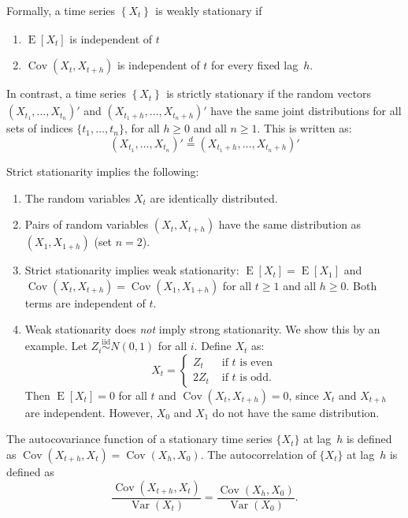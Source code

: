 \documentclass[11pt,a4]{article}
\DeclareMathOperator{\cov}{Cov}
\DeclareMathOperator{\E}{E}
\DeclareMathOperator{\var}{Var}
\newcommand{\ts}[3]{\ensuremath{\left \{ #1 \right \}_{#2}^{#3}}}
\newcommand{\eqd}{\ensuremath{\stackrel{d}{=}}}
\newcommand{\iid}{\ensuremath{\stackrel{\text{iid}}{\sim}}}
\begin{document}
Formally, a time series $\ts{X_t}{}{}$ is weakly stationary if 
\begin{enumerate}
	\item $\E[X_t]$ is independent of $t$
	\item $\cov(X_t, X_{t + h})$ is independent of $t$ for every fixed lag~$h$.
\end{enumerate} 
In contrast, a time series $\ts{X_t}{}{}$ is strictly stationary if the random vectors $(X_{t_1}, \ldots, X_{t_n})'$ and $(X_{t_1 + h}, \ldots, X_{t_n + h})'$
have the same joint distributions for all sets of indices 
$\{t_1, \ldots, t_n\}$, for all $h \geq 0$ and all $n \geq 1$. This is written 
as:
\[
(X_{t_1}, \ldots, X_{t_n})' \eqd (X_{t_1 + h}, \ldots, X_{t_n + h})'
\] 

Strict stationarity implies the following:
\begin{enumerate}
	\item The random variables $X_t$ are identically distributed.
	
	\item Pairs of random variables $(X_t, X_{t + h})$ have the same 
	distribution as $(X_1, X_{1 + h})$ (set $n = 2$).
	
	\item Strict stationarity implies weak stationarity: $\E[X_t] = \E[X_1]$
	and $\cov(X_t, X_{t + h}) = \cov(X_1, X_{1 + h})$ for all $t \geq 1$ and 
	all $h \geq 0$. Both terms are independent of $t$.
	
	\item Weak stationarity does \emph{not} imply strong stationarity. We show
	this by an example. Let $Z_i \iid N(0, 1)$ for all $i$. Define $X_t$ as:
	\[
		X_t = \left \{ \begin{array}{ll}
							Z_t   & \text{ if $t$ is even}\\
							2 Z_t & \text{ if $t$ is odd}.   
					   \end{array}	\right .
	\] 
	Then $\E[X_t] = 0$ for all $t$ and $\cov(X_t, X_{t + h}) = 0$, since $X_t$ 
	and $X_{t + h}$ are independent. However, $X_0$ and $X_1$ do not have the 
	same distribution.
\end{enumerate}

The autocovariance function of a stationary time series $\{ X_t \}$ at lag~$h$
is defined as $\cov(X_{t + h}, X_{t}) = \cov(X_{h}, X_{0})$. The autocorrelation
of $\{ X_t \}$ at lag~$h$ is defined as 
\[
	\frac{ \cov(X_{t + h}, X_t) }{ \var(X_t) } = 
	\frac{ \cov( X_h, X_0 )}{ \var(X_0) }.
\]   
\end{document}

